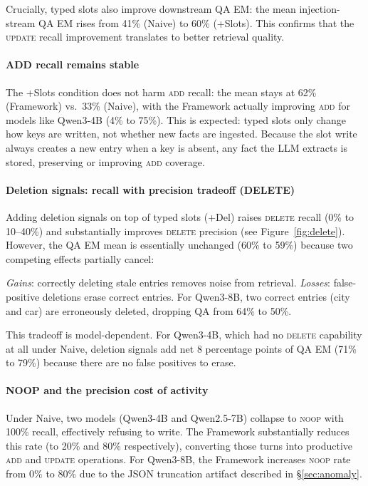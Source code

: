 \documentclass[10pt, twocolumn]{article}
\begin{document}
Crucially, typed slots also improve downstream QA EM: the mean injection-stream
QA EM rises from 41\% (Naive) to 60\% (+Slots).
This confirms that the \textsc{update} recall improvement translates to
better retrieval quality.

\paragraph{ADD recall remains stable}
The +Slots condition does not harm \textsc{add} recall: the mean stays at
62\% (Framework) vs.\ 33\% (Naive), with the Framework actually improving
\textsc{add} for models like Qwen3-4B (4\% to 75\%).
This is expected: typed slots only change how keys are written, not whether
new facts are ingested. Because the slot write always creates a new entry
when a key is absent, any fact the LLM extracts is stored, preserving or
improving \textsc{add} coverage.

\paragraph{Deletion signals: recall with precision tradeoff (DELETE)}
Adding deletion signals on top of typed slots (+Del) raises
\textsc{delete} recall (0\% to 10--40\%) and substantially improves
\textsc{delete} precision (see Figure~\ref{fig:delete}).
However, the QA EM mean is essentially unchanged (60\% to 59\%) because
two competing effects partially cancel:

\emph{Gains}: correctly deleting stale entries removes noise from retrieval.
\emph{Losses}: false-positive deletions erase correct entries.
For Qwen3-8B, two correct entries (city and car) are erroneously deleted,
dropping QA from 64\% to 50\%.

This tradeoff is model-dependent.
For Qwen3-4B, which had no \textsc{delete} capability at all under Naive,
deletion signals add net 8 percentage points of QA EM (71\% to 79\%) because
there are no false positives to erase.

\paragraph{NOOP and the precision cost of activity}
Under Naive, two models (Qwen3-4B and Qwen2.5-7B) collapse to
\textsc{noop} with 100\% recall, effectively refusing to write.
The Framework substantially reduces this rate (to 20\% and 80\%
respectively), converting those turns into productive \textsc{add} and
\textsc{update} operations.
For Qwen3-8B, the Framework increases \textsc{noop} rate from 0\% to 80\%
due to the JSON truncation artifact described in \S\ref{sec:anomaly}.
\end{document}
